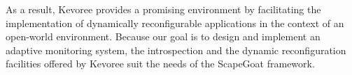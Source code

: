 As a result, Kevoree provides a promising environment by facilitating the implementation of dynamically reconfigurable applications in the context of an open-world environment.
Because our goal is to design and implement an adaptive monitoring system, the introspection and the dynamic reconfiguration facilities offered by Kevoree suit the needs of the ScapeGoat framework.

%


